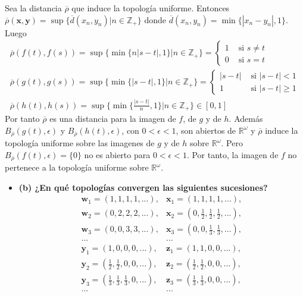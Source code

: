 \documentclass{article}
\newcommand{\vect}[1]{\boldsymbol{#1}}
\begin{document}
 Sea la distancia $\overline{\rho}$  que induce la topología uniforme. Entonces 
$\overline{\rho}(\vect{x},\vect{y})=\sup\{\overline{d}(x_n,y_n)|n\in \mathbb{Z}_+\}$ donde $\overline{d}(x_n,y_n)=\min\{|x_n-y_n|,1\}$. Luego
\begin{eqnarray}
 \overline{\rho}(f(t),f(s))=\sup\{\min\{n|s-t|,1\}|n\in \mathbb{Z}_+\}=\begin{cases}
1 & \text{ si } s\neq t\nonumber\\
0 & \text{ si } s= t\end{cases}\nonumber\\
 \overline{\rho}(g(t),g(s))=\sup\{\min\{|s-t|,1\}|n\in \mathbb{Z}_+\}=\begin{cases}
|s-t| & \text{ si } |s-t| < 1 \nonumber \\
1 & \text{ si } |s-t| \geq 1 \nonumber
\end{cases}\nonumber\\
 \overline{\rho}(h(t),h(s))=\sup\{\min\{\frac{|s-t|}{n},1\}|n\in \mathbb{Z}_+\}\in [0,1]\nonumber
\end{eqnarray}
Por tanto $\overline{\rho}$ es una distancia para la imagen de $f$, de $g$ y de $h$. Además $B_{\overline{\rho}}(g(t),\epsilon)$ y $B_{\overline{\rho}}(h(t),\epsilon)$, con $0<\epsilon<1$, son abiertos de $\mathbb{R}^{\omega}$ y $\overline{\rho}$ induce la topología uniforme sobre las imagenes de $g$ y de $h$ sobre $\mathbb{R}^\omega$. Pero $B_{\overline{\rho}}(f(t),\epsilon)=\{0\}$ no es abierto para $0<\epsilon<1$. Por tanto, la imagen de $f$ no pertenece a la topología uniforme sobre $\mathbb{R}^\omega$.
\begin{itemize}
\item \bf(b) \rm  ¿En qué topologías convergen las siguientes sucesiones?
\begin{eqnarray}
\vect{w}_1=(1,1,1,1,...), & \vect{x}_1=(1,1,1,1,...), \nonumber\\
\vect{w}_2=(0,2,2,2,...), & \vect{x}_2=(0,\frac{1}{2},\frac{1}{2},\frac{1}{2},...), \nonumber\\
\vect{w}_3=(0,0,3,3,...), & \vect{x}_3=(0,0,\frac{1}{3},\frac{1}{3},...), \nonumber\\
... & ...\nonumber\\
\vect{y}_1=(1,0,0,0,...), & \vect{z}_1=(1,1,0,0,...),  \nonumber\\
\vect{y}_2=(\frac{1}{2},\frac{1}{2},0,0,...), & \vect{z}_2=(\frac{1}{2},\frac{1}{2},0,0,...), \nonumber\\
\vect{y}_3=(\frac{1}{3},\frac{1}{3},\frac{1}{3},0,...), & \vect{z}_3=(\frac{1}{3},\frac{1}{3},0,0,...),  \nonumber\\
... & ...\nonumber
\end{eqnarray}
\end{itemize}
\end{document}
